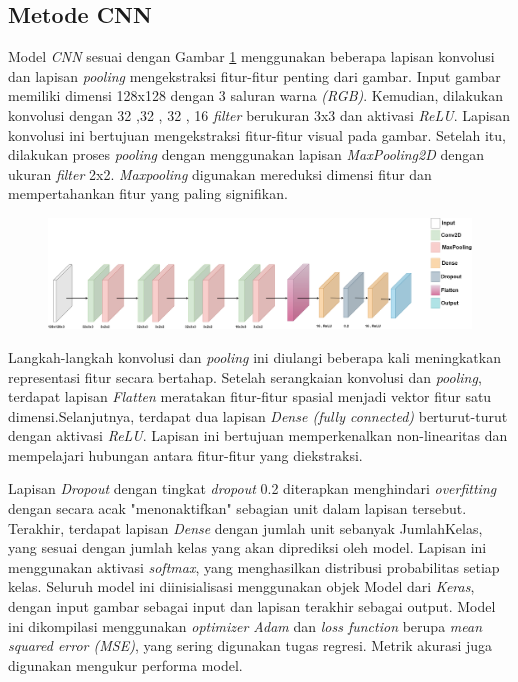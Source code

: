 \subsection{Metode CNN}
Model \textit{CNN} sesuai dengan Gambar \ref{fig:layerCNN} menggunakan beberapa lapisan konvolusi dan lapisan \textit{pooling} mengekstraksi fitur-fitur penting dari gambar. Input gambar memiliki dimensi 128x128 dengan 3 saluran warna \textit{(RGB)}. Kemudian, dilakukan konvolusi dengan 32 ,32 , 32 , 16 \textit{filter} berukuran 3x3 dan aktivasi \textit{ReLU}. Lapisan konvolusi ini bertujuan mengekstraksi fitur-fitur visual pada gambar. Setelah itu, dilakukan proses \textit{pooling} dengan menggunakan lapisan \textit{MaxPooling2D} dengan ukuran \textit{filter} 2x2. \textit{Maxpooling} digunakan mereduksi dimensi fitur dan mempertahankan fitur yang paling signifikan.
\begin{figure}[hbt!]
	\includegraphics[width=1.0\linewidth]{gambar/bener/Arsitektur_CNN_Revisi.png}
	\label{fig:layerCNN}
\end{figure}
Langkah-langkah konvolusi dan \textit{pooling} ini diulangi beberapa kali meningkatkan representasi fitur secara bertahap. Setelah serangkaian konvolusi dan \textit{pooling}, terdapat lapisan \textit{Flatten} meratakan fitur-fitur spasial menjadi vektor fitur satu dimensi.Selanjutnya, terdapat dua lapisan \textit{{Dense} (fully connected)} berturut-turut dengan aktivasi \textit{ReLU}. Lapisan ini bertujuan memperkenalkan non-linearitas dan mempelajari hubungan antara fitur-fitur yang diekstraksi.

Lapisan \textit{Dropout} dengan tingkat \textit{dropout} 0.2 diterapkan menghindari \textit{overfitting} dengan secara acak "menonaktifkan" sebagian unit dalam lapisan tersebut. Terakhir, terdapat lapisan {\textit{Dense}} dengan jumlah unit sebanyak JumlahKelas, yang sesuai dengan jumlah kelas yang akan diprediksi oleh model. Lapisan ini menggunakan aktivasi \textit{softmax}, yang menghasilkan distribusi probabilitas setiap kelas. Seluruh model ini diinisialisasi menggunakan objek Model dari \textit{Keras}, dengan input gambar sebagai input dan lapisan terakhir sebagai output. Model ini dikompilasi menggunakan \textit{optimizer Adam} dan \textit{loss function} berupa \textit{mean squared error (MSE)}, yang sering digunakan tugas regresi. Metrik akurasi juga digunakan mengukur performa model.

